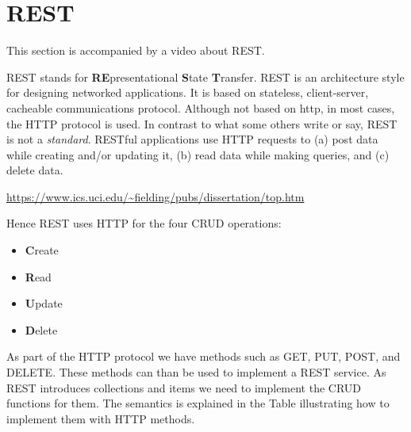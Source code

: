 
\chapter{REST}

This section is accompanied by a video about REST.


REST stands for {\bf RE}presentational {\bf S}tate {\bf
  T}ransfer. REST is an architecture style for designing networked
applications. It is based on stateless, client-server, cacheable
communications protocol. Although not based on http, in most cases,
the HTTP protocol is used. In contrast to what some others write or
say, REST is not a \emph{standard}. RESTful applications use HTTP
requests to (a) post data while creating and/or updating it, (b) read
data while making queries, and (c) delete data.

\url{https://www.ics.uci.edu/~fielding/pubs/dissertation/top.htm}

Hence REST uses HTTP for the four CRUD operations:

\begin{itemize}
\item  {\bf C}reate 
\item  {\bf R}ead
\item  {\bf U}pdate
\item  {\bf D}elete
\end{itemize}

As part of the HTTP protocol we have methods such as GET, PUT, POST, and
DELETE. These methods can than be used to implement a REST service. As
REST introduces collections and items we need to implement the CRUD
functions for them. The semantics is explained in the Table
illustrating how to implement them with HTTP methods.

